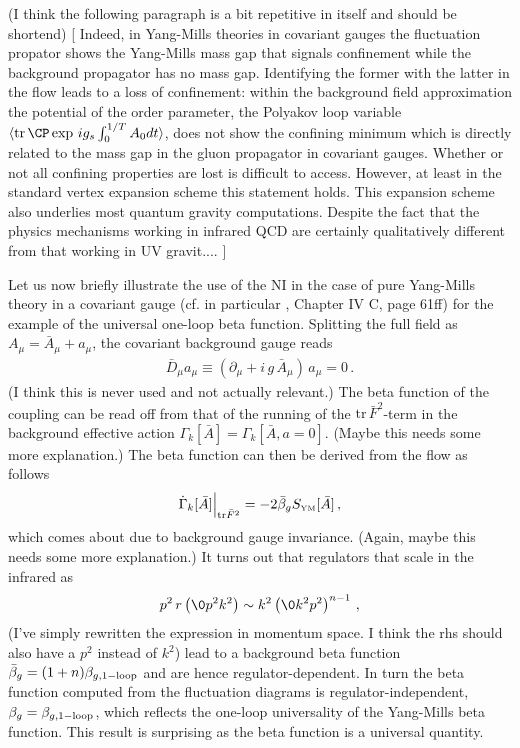 \documentclass[11pt]{book} %
\newcommand{\tr}{\mathrm{tr}}
\begin{document}
{{\colpl (I think the following paragraph is a bit
	repetitive in itself and should be shortend) [}
Indeed, in Yang-Mills theories in covariant gauges the fluctuation
propator shows the Yang-Mills mass gap that signals confinement while
the background propagator has no mass gap. Identifying the former with
the latter in the flow leads to a loss of confinement: within the
background field approximation the potential of the order parameter,
the Polyakov loop variable $\langle \tr \, \CP \exp \, i g_s
\int_0^{1/T} A_0 dt\rangle $, does not show the confining minimum
which is directly related to the mass gap in the gluon propagator in
covariant gauges. Whether or not all confining properties are lost is
difficult to access. However, at least in the standard vertex
expansion scheme this statement holds. This expansion scheme also
underlies most quantum gravity computations. Despite the fact that the
physics mechanisms working in infrared QCD are certainly qualitatively
different from that working in UV gravit....
{\colpl ]}

Let us now briefly illustrate the use of the NI
in the case of
pure Yang-Mills theory in a covariant gauge (cf. in particular
\cite{PawlowskiH}, Chapter IV C, page 61ff) for the example of the
universal one-loop beta function.
Splitting the full field as
$A_\mu=\bar A_\mu+a_\mu$,
the covariant background gauge reads
\begin{align}
	\bar D_\mu a_\mu \equiv (\partial_\mu + i\,g\,\bar A_\mu) \, a_\mu=0\,.
\end{align}
{\colpl (I think this is never used and not actually relevant.)}
The beta function of the coupling can be read off from that of the
running of the $\tr \,\bar F^2$-term in the background effective
action $\Gamma_k[\bar A]=\Gamma_k[\bar A, a=0]$.
{\colpl (Maybe this needs some more explanation.)}
The beta function can then be derived from the flow as follows
\begin{align}\label{eq:betabarA}
	\dot \Gamma_k[\bar A]\Big|_{\tr \bar F^2} = - 2 \bar \beta_g
	S_{\text{\tiny YM}}[\bar A]\,,
\end{align}
which comes about due to background gauge invariance.
{\colpl (Again, maybe this needs some more explanation.)}
It turns out that regulators that scale in the infrared as
\begin{align}\label{eq:IRRk}
	p^2 \, r \left( \0{p^2}{k^2} \right)
	\sim k^2  \left( \0{k^2}{p^2} \right)^{n-1}\,,
\end{align}
{\colpl (I've simply rewritten the expression in momentum space.
I think the rhs should also have a $p^2$ instead of $k^2$)}
lead to a background beta function $\bar \beta_g = (1+n)
\beta_{g,\rm 1-loop}$ and are hence regulator-dependent. In turn the
beta function computed from the fluctuation diagrams is
regulator-independent, $\beta_g=\beta_{g,\rm 1-loop}$, which reflects
the one-loop universality of the Yang-Mills beta function.
This result is surprising as the beta function is a universal
quantity.

}
\end{document}
